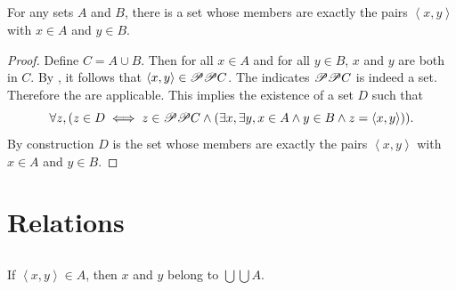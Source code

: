 \documentclass{report}
\begin{document}
\subsection{}%
\label{sub:corollary-3c}

\begin{theorem}[3C]

  For any sets $A$ and $B$, there is a set whose members are exactly the
    pairs $\left< x, y \right>$ with $x \in A$ and $y \in B$.

\end{theorem}

\begin{proof}



  Define $C = A \cup B$.
  Then for all $x \in A$ and for all $y \in B$, $x$ and $y$ are both in $C$.
  By , it follows that
    $\left< x, y \right> \in \mathscr{P}\mathscr{P}C$.
  The  indicates $\mathscr{P}\mathscr{P}C$ is
    indeed a set.
  Therefore the  are applicable.
  This implies the existence of a set $D$ such that
    $$\forall z, (z \in D \iff z \in \mathscr{P}\mathscr{P}C \land
      (\exists x, \exists y, x \in A \land y \in B \land
        z = \left< x, y \right>)).$$
  By construction $D$ is the set whose members are exactly the pairs
    $\left< x, y \right>$ with $x \in A$ and $y \in B$.

\end{proof}

\section{Relations}%
\label{sec:relations}

\subsection{}%
\label{sub:theorem-3d}

\begin{theorem}[3D]

  If $\left< x, y \right> \in A$, then $x$ and $y$ belong to $\bigcup\bigcup A$.

\end{theorem}
\end{document}
